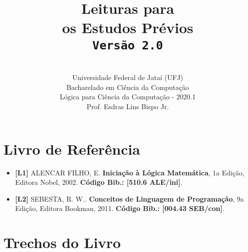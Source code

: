 \documentclass[12pt,a4paper,oneside]{article}
\author{\\Universidade Federal de Jataí (UFJ)\\Bacharelado em Ciência da Computação \\Lógica para Ciência da Computação - 2020.1 \\Prof. Esdras Lins Bispo Jr.}
\date{}
\title{
	\sc \huge Leituras para \\os Estudos Prévios
	\\{\tt Versão 2.0}
}
\begin{document}
\maketitle

\section{Livro de Referência}
	\begin{itemize}
		\item[] {\bf \color{blue} [L1]} ALENCAR FILHO, E. {\bf Iniciação à Lógica Matemática}, 1a Edição, Editora Nobel, 2002. {\color{blue} \bf Código Bib.: [510.6 ALE/ini]}.
		\item[] {\bf \color{purple} [L2]} SEBESTA, R. W.. {\bf Conceitos de Linguagem de Programação}, 9a Edição, Editora Bookman, 2011. { \color{purple} \bf Código Bib.: [004.43 SEB/con]}.
	\end{itemize}
	
\section{Trechos do Livro}
\end{document}
